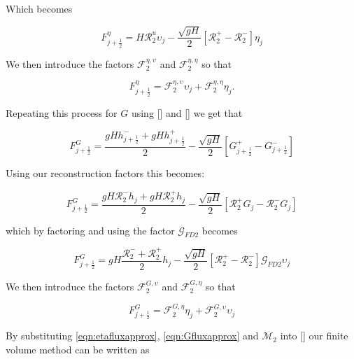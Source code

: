 Which becomes

\begin{equation*}
F^{\eta}_{j+\frac{1}{2}} = H \mathcal{R}^u_2 \upsilon_{j}   - \dfrac{ \sqrt{gH}}{ 2} \left [  \mathcal{R}^+_2 -  \mathcal{R}^-_2 \right ] {\eta}_j
\end{equation*}

We then introduce the factors $\mathcal{F}_2^{\eta,\upsilon}$ and $\mathcal{F}_2^{\eta,\eta}$ so that 

\begin{equation}
\label{eqn:etafluxapprox}
F^{\eta}_{j+\frac{1}{2}} = \mathcal{F}_2^{\eta,\upsilon} \upsilon_{j}   +  \mathcal{F}_2^{\eta,\eta} {\eta}_j.
\end{equation}

Repeating this process for $G$ using [] and [] we get that

\begin{equation}
\label{eqn:HLL_fluxG}
F^{G}_{j+\frac{1}{2}} = \dfrac{ gHh^-_{j+\frac{1}{2}} + gHh^+_{j+\frac{1}{2}}}{ 2}  - \dfrac{ \sqrt{gH}}{ 2} \left [ G^+_{j+\frac{1}{2}} - G^-_{j+\frac{1}{2}} \right ]
\end{equation}

Using our reconstruction factors this becomes:

\begin{equation*}
F^{G}_{j+\frac{1}{2}} = \dfrac{ gH \mathcal{R}^-_2h_{j} + gH \mathcal{R}^+_2 h_{j}}{ 2}  - \dfrac{ \sqrt{gH}}{ 2} \left [  \mathcal{R}^+_2 G_{j} -  \mathcal{R}^-_2G_{j} \right ]
\end{equation*}

which by factoring and using the factor $\mathcal{G}_{FD2}$ becomes

\begin{equation*}
F^{G}_{j+\frac{1}{2}} =  gH \dfrac{\mathcal{R}^-_2 + \mathcal{R}^+_2 }{ 2} h_{j}  - \dfrac{ \sqrt{gH}}{ 2} \left [  \mathcal{R}^+_2 -  \mathcal{R}^-_2 \right ] \mathcal{G}_{FD2}\upsilon_j
\end{equation*}

We then introduce the factors $\mathcal{F}_2^{G,\upsilon}$ and $\mathcal{F}_2^{G,\eta}$ so that 

\begin{equation}
\label{eqn:Gfluxapprox}
F^{G}_{j+\frac{1}{2}} =  \mathcal{F}_2^{G,\eta} \eta_{j}  + \mathcal{F}_2^{G,\upsilon} \upsilon_j
\end{equation}

By substituting \eqref{eqn:etafluxapprox}, \eqref{eqn:Gfluxapprox} and $\mathcal{M}_2$ into [] our finite volume method can be written as


